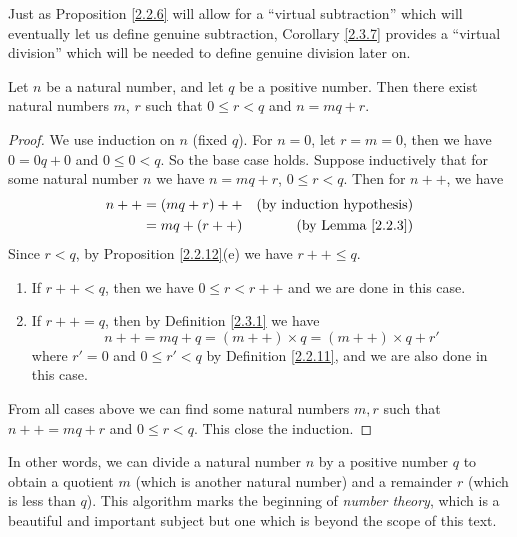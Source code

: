 \begin{remark}\label{2.3.8}
Just as Proposition \ref{2.2.6} will allow for a ``virtual subtraction'' which will eventually let us define genuine subtraction, Corollary \ref{2.3.7} provides a ``virtual division'' which will be needed to define genuine division later on.
\end{remark}

\begin{proposition}\label{2.3.9}
Let \(n\) be a natural number, and let \(q\) be a positive number.
Then there exist natural numbers \(m\), \(r\) such that \(0 \leq r<q\) and \(n = mq + r\).
\end{proposition}

\begin{proof}
We use induction on \(n\) (fixed \(q\)).
For \(n = 0\), let \(r = m = 0\), then we have \(0 = 0q + 0\) and \(0 \leq 0 < q\).
So the base case holds.
Suppose inductively that for some natural number \(n\) we have \(n = mq + r\), \(0 \leq r < q\).
Then for \(n++\), we have
\begin{align*}
n++ &= (mq + r)++ & \text{(by induction hypothesis)} \\
&= mq + (r++) & \text{(by Lemma \ref{2.2.3})} \\
\end{align*}
Since \(r < q\), by Proposition \ref{2.2.12}(e) we have \(r++ \leq q\).
\begin{enumerate}
    \item If \(r++ < q\), then we have \(0 \leq r < r++\) and we are done in this case.
    \item If \(r++ = q\), then by Definition \ref{2.3.1} we have
    \[
        n++ = mq + q = (m++) \times q = (m++) \times q + r'
    \]
    where \(r' = 0\) and \(0 \leq r' < q\) by Definition \ref{2.2.11}, and we are also done in this case.
\end{enumerate}
From all cases above we can find some natural numbers \(m, r\) such that \(n++ = mq + r\) and \(0 \leq r < q\).
This close the induction.
\end{proof}

\begin{remark}\label{2.3.10}
In other words, we can divide a natural number \(n\) by a positive number \(q\) to obtain a quotient \(m\) (which is another natural number) and a remainder \(r\) (which is less than \(q\)).
This algorithm marks the beginning of \emph{number theory}, which is a beautiful and important subject but one which is beyond the scope of this text.
\end{remark}

